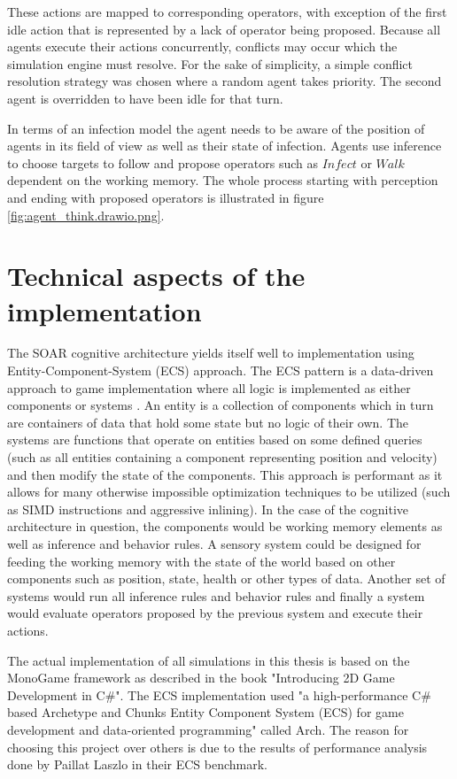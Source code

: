 These actions are mapped to corresponding operators, with exception of the first idle action that is represented by a lack of operator being proposed.
Because all agents execute their actions concurrently, conflicts may occur which the simulation engine must resolve.
For the sake of simplicity, a simple conflict resolution strategy was chosen where a random agent takes priority.
The second agent is overridden to have been idle for that turn.

In terms of an infection model the agent needs to be aware of the position of agents in its field of view as well as their state of infection.
Agents use inference to choose targets to follow and propose operators such as $Infect$ or $Walk$ dependent on the working memory.
The whole process starting with perception and ending with proposed operators is illustrated in figure \ref{fig:agent_think.drawio.png}.

\section{Technical aspects of the implementation}

The SOAR cognitive architecture yields itself well to implementation using Entity-Component-System (ECS) approach.
The ECS pattern is a data-driven approach to game implementation where all logic is implemented as either components or systems \cite{raffaillac2019polyphony}.
An entity is a collection of components which in turn are containers of data that hold some state but no logic of their own.
The systems are functions that operate on entities based on some defined queries (such as all entities containing a component representing position and velocity) and then modify the state of the components.
This approach is performant as it allows for many otherwise impossible optimization techniques to be utilized (such as SIMD instructions and aggressive inlining)\cite{harkonen2019advantages}.
In the case of the cognitive architecture in question, the components would be working memory elements as well as inference and behavior rules.
A sensory system could be designed for feeding the working memory with the state of the world based on other components such as position, state, health or other types of data.
Another set of systems would run all inference rules and behavior rules and finally a system would evaluate operators proposed by the previous system and execute their actions.

The actual implementation of all simulations in this thesis is based on the MonoGame framework as described in the book "Introducing 2D Game Development in C\#"\cite{pavleas2013introducing}.
The ECS implementation used "a high-performance C\# based Archetype and Chunks Entity Component System (ECS) for game development and data-oriented programming" called Arch\cite{matthaeus2023arch}.
The reason for choosing this project over others is due to the results of performance analysis done by Paillat Laszlo in their ECS benchmark\cite{laszlo2023arch}.

